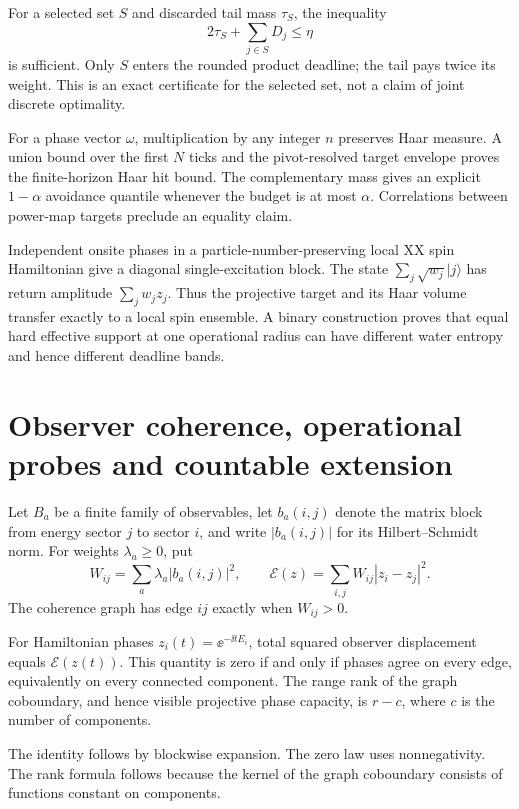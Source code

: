 For a selected set $S$ and discarded tail mass $\tau_S$, the inequality
\[
 2\tau_S+\sum_{j\in S}D_j\le\eta
\]
is sufficient.  Only $S$ enters the rounded product deadline; the tail pays
twice its weight.  This is an exact certificate for the selected set, not a
claim of joint discrete optimality.

For a phase vector $\omega$, multiplication by any integer $n$ preserves
Haar measure.  A union bound over the first $N$ ticks and the pivot-resolved
target envelope proves the finite-horizon Haar hit bound.  The complementary
mass gives an explicit $1-\alpha$ avoidance quantile whenever the budget is
at most $\alpha$.  Correlations between power-map targets preclude an
equality claim.

Independent onsite phases in a particle-number-preserving local XX spin
Hamiltonian give a diagonal single-excitation block.  The state
$\sum_j\sqrt{w_j}|j\rangle$ has return amplitude
$\sum_jw_jz_j$.  Thus the projective target and its Haar volume transfer
exactly to a local spin ensemble.  A binary construction proves that equal
hard effective support at one operational radius can have different water
entropy and hence different deadline bands.

\section{Observer coherence, operational probes and countable extension}

Let $B_a$ be a finite family of observables, let $b_a(i,j)$ denote the
matrix block from energy sector $j$ to sector $i$, and write
$|b_a(i,j)|$ for its Hilbert--Schmidt norm.  For weights
$\lambda_a\ge0$, put
\[
 W_{ij}=\sum_a\lambda_a|b_a(i,j)|^2,
 \qquad
 \mathcal E(z)=\sum_{i,j}W_{ij}|z_i-z_j|^2.
\]
The coherence graph has edge $ij$ exactly when $W_{ij}>0$.

\begin{theorem}
For Hamiltonian phases $z_i(t)=\ee^{-\ii tE_i}$, total squared observer
displacement equals $\mathcal E(z(t))$.  This quantity is zero if and only
if phases agree on every edge, equivalently on every connected component.
The range rank of the graph coboundary, and hence visible projective phase
capacity, is $r-c$, where $c$ is the number of components.
\end{theorem}

The identity follows by blockwise expansion.  The zero law uses
nonnegativity.  The rank formula follows because the kernel of the graph
coboundary consists of functions constant on components.

